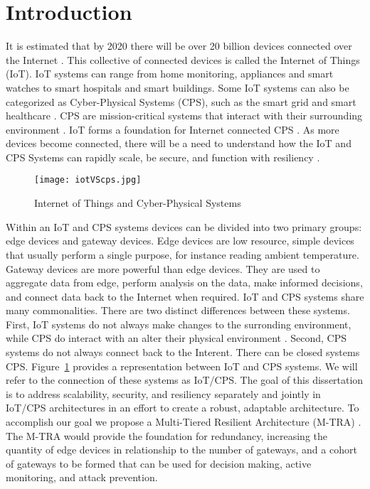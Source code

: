\documentclass[../main.tex]{subfiles}
\begin{document}
\section{Introduction}

It is estimated that by 2020 there will be over 20 billion devices connected over the Internet \cite{gartner, juniper-research,stats-iot}. This collective of connected devices is called the Internet of Things (IoT). IoT systems can range from home monitoring, appliances and smart watches to smart hospitals and smart buildings. Some IoT systems can also be categorized as Cyber-Physical Systems (CPS), such as the smart grid and smart healthcare \cite{ideas2020,els,k-ieee}. CPS are mission-critical systems that interact with their surrounding environment \cite{shi2011survey, baheti2011cyber,banerjee2012ensuring}. IoT forms a foundation for Internet connected CPS \cite{k-ieee}. As more devices become connected, there will be a need to understand how the IoT and CPS Systems can rapidly scale, be secure, and function with resiliency \cite{6803220,7275445}. 


\begin{figure}[!htb]
    \centering
    \texttt{[image: iotVScps.jpg]}
    \caption{Internet of Things and Cyber-Physical Systems}
    \label{fig:iot-v-cps}
\end{figure}

Within an IoT and CPS systems devices can be divided into two primary groups: edge devices and gateway devices. Edge devices are low resource, simple devices that usually perform a single purpose, for instance reading ambient temperature. Gateway devices are more powerful than edge devices. They are used to aggregate data from edge, perform analysis on the data, make informed decisions, and connect data back to the Internet when required. IoT and CPS systems share many commonalities. There are two distinct differences between these systems. First, IoT systems do not always make changes to the surronding environment, while CPS do interact with an alter their physical environment \cite{els, k-ieee}. Second, CPS systems do not always connect back to the Interent. There can be closed systems CPS. Figure~\ref{fig:iot-v-cps} provides a representation between IoT and CPS systems. We will refer to the connection of these systems as IoT/CPS. The goal of this dissertation is to address scalability, security, and resiliency separately and jointly in IoT/CPS architectures in an effort to create a robust, adaptable architecture. To accomplish our goal we propose a Multi-Tiered Resilient Architecture (M-TRA) . The M-TRA would provide the foundation for redundancy, increasing the quantity of edge devices in relationship to the number of gateways, and a cohort of gateways to be formed that can be used for decision making, active monitoring, and attack prevention. 
\end{document}
